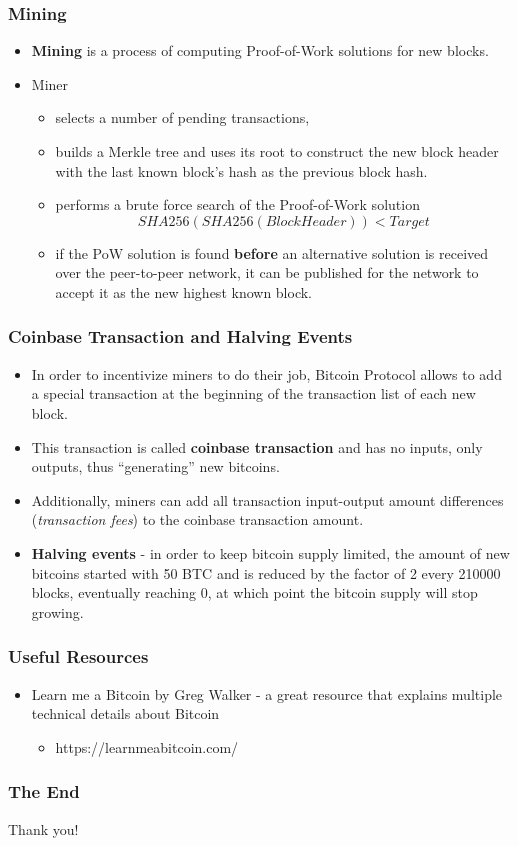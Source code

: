 \documentclass{beamer}
\begin{document}
\begin{frame}
  \frametitle{Mining}
  \begin{itemize}
  \item \textbf{Mining} is a process of computing Proof-of-Work solutions for
    new blocks.
  \item Miner
    \begin{itemize}
    \item selects a number of pending transactions,
    \item builds a Merkle tree and uses its root to construct the new block
      header with the last known block's hash as the previous block hash.
    \item performs a brute force search of the Proof-of-Work solution
      $$SHA256(SHA256(BlockHeader)) < Target$$
    \item if the PoW solution is found \textbf{before} an alternative solution
      is received over the peer-to-peer network, it can be published for the
      network to accept it as the new highest known block.
    \end{itemize}
  \end{itemize}
\end{frame}

\begin{frame}
  \frametitle{Coinbase Transaction and Halving Events}
  \begin{itemize}
  \item In order to incentivize miners to do their job, Bitcoin Protocol allows
    to add a special transaction at the beginning of the transaction list of
    each new block.
  \item This transaction is called \textbf{coinbase transaction} and has no
    inputs, only outputs, thus ``generating'' new bitcoins.
  \item Additionally, miners can add all transaction input-output amount
    differences (\textit{transaction fees}) to the coinbase transaction amount.
  \item \textbf{Halving events} - in order to keep bitcoin supply limited, the
    amount of new bitcoins started with 50 BTC and is reduced by the factor of 2
    every 210000 blocks, eventually reaching 0, at which point the bitcoin
    supply will stop growing.
  \end{itemize}
\end{frame}

\begin{frame}
  \frametitle{Useful Resources}
  \begin{itemize}
  \item Learn me a Bitcoin by Greg Walker - a great resource that explains
    multiple technical details about Bitcoin
    \begin{itemize}
    \item https://learnmeabitcoin.com/
    \end{itemize}
  \end{itemize}
\end{frame}

\begin{frame}
  \frametitle{The End}
  \begin{center}
    Thank you!
  \end{center}
\end{frame}
\end{document}

